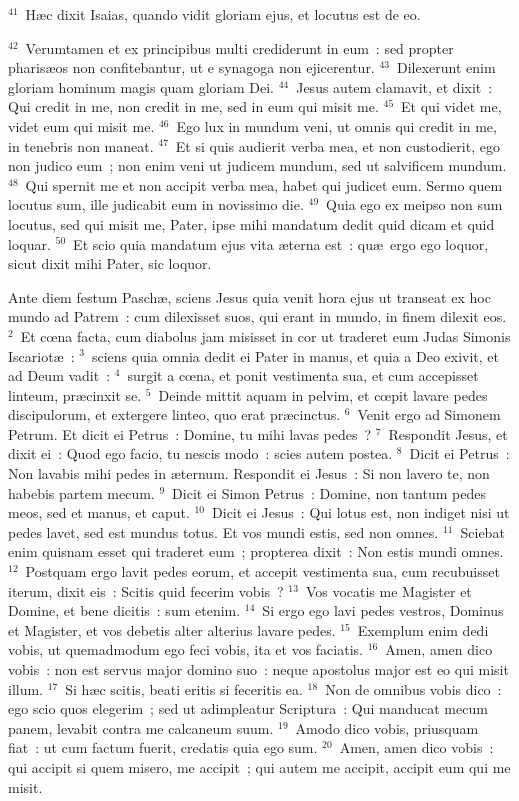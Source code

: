 ${}^{41}$~H\ae c dixit Isaias, quando vidit gloriam ejus, et locutus est de eo.


${}^{42}$~Verumtamen et ex principibus multi crediderunt in eum~: sed propter pharis\ae os non confitebantur, ut e synagoga non ejicerentur.
${}^{43}$~Dilexerunt enim gloriam hominum magis quam gloriam Dei.
${}^{44}$~Jesus autem clamavit, et dixit~: Qui credit in me, non credit in me, sed in eum qui misit me.
${}^{45}$~Et qui videt me, videt eum qui misit me.
${}^{46}$~Ego lux in mundum veni, ut omnis qui credit in me, in tenebris non maneat.
${}^{47}$~Et si quis audierit verba mea, et non custodierit, ego non judico eum~; non enim veni ut judicem mundum, sed ut salvificem mundum.
${}^{48}$~Qui spernit me et non accipit verba mea, habet qui judicet eum. Sermo quem locutus sum, ille judicabit eum in novissimo die.
${}^{49}$~Quia ego ex meipso non sum locutus, sed qui misit me, Pater, ipse mihi mandatum dedit quid dicam et quid loquar.
${}^{50}$~Et scio quia mandatum ejus vita \ae terna est~: qu\ae\ ergo ego loquor, sicut dixit mihi Pater, sic loquor.

\lettrine[lines=10,image=true,loversize=0.05,lraise=-0.03]{A}{}nte diem festum Pasch\ae , sciens Jesus quia venit hora ejus ut transeat ex hoc mundo ad Patrem~: cum dilexisset suos, qui erant in mundo, in finem dilexit eos.
${}^{2}$~Et cœna facta, cum diabolus jam misisset in cor ut traderet eum Judas Simonis Iscariot\ae~:
${}^{3}$~sciens quia omnia dedit ei Pater in manus, et quia a Deo exivit, et ad Deum vadit~:
${}^{4}$~surgit a cœna, et ponit vestimenta sua, et cum accepisset linteum, pr\ae cinxit se.
${}^{5}$~Deinde mittit aquam in pelvim, et cœpit lavare pedes discipulorum, et extergere linteo, quo erat pr\ae cinctus.
${}^{6}$~Venit ergo ad Simonem Petrum. Et dicit ei Petrus~: Domine, tu mihi lavas pedes~?
${}^{7}$~Respondit Jesus, et dixit ei~: Quod ego facio, tu nescis modo~: scies autem postea.
${}^{8}$~Dicit ei Petrus~: Non lavabis mihi pedes in \ae ternum. Respondit ei Jesus~: Si non lavero te, non habebis partem mecum.
${}^{9}$~Dicit ei Simon Petrus~: Domine, non tantum pedes meos, sed et manus, et caput.
${}^{10}$~Dicit ei Jesus~: Qui lotus est, non indiget nisi ut pedes lavet, sed est mundus totus. Et vos mundi estis, sed non omnes.
${}^{11}$~Sciebat enim quisnam esset qui traderet eum~; propterea dixit~: Non estis mundi omnes.
${}^{12}$~Postquam ergo lavit pedes eorum, et accepit vestimenta sua, cum recubuisset iterum, dixit eis~: Scitis quid fecerim vobis~?
${}^{13}$~Vos vocatis me Magister et Domine, et bene dicitis~: sum etenim.
${}^{14}$~Si ergo ego lavi pedes vestros, Dominus et Magister, et vos debetis alter alterius lavare pedes.
${}^{15}$~Exemplum enim dedi vobis, ut quemadmodum ego feci vobis, ita et vos faciatis.
${}^{16}$~Amen, amen dico vobis~: non est servus major domino suo~: neque apostolus major est eo qui misit illum.
${}^{17}$~Si h\ae c scitis, beati eritis si feceritis ea.
${}^{18}$~Non de omnibus vobis dico~: ego scio quos elegerim~; sed ut adimpleatur Scriptura~: Qui manducat mecum panem, levabit contra me calcaneum suum.
${}^{19}$~Amodo dico vobis, priusquam fiat~: ut cum factum fuerit, credatis quia ego sum.
${}^{20}$~Amen, amen dico vobis~: qui accipit si quem misero, me accipit~; qui autem me accipit, accipit eum qui me misit.


